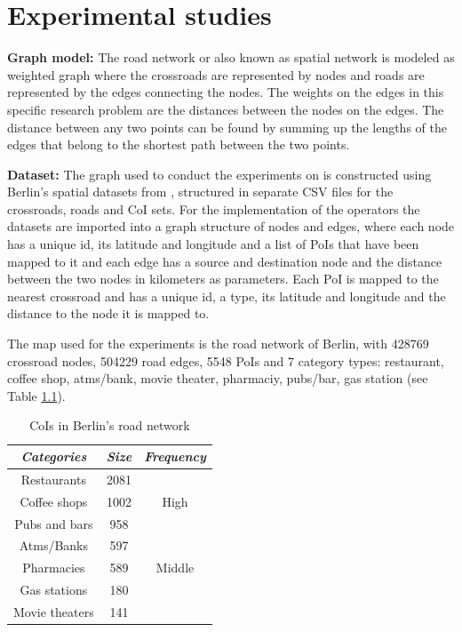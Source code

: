 \chapter{Experimental studies}
\label{sec:evaluation}

\textbf{Graph model:}
The road network or also known as spatial network is modeled as weighted graph where the crossroads are represented by nodes and roads are represented by the edges connecting the nodes. The weights on the edges in this specific research problem are the distances between the nodes on the edges. The distance between any two points can be found by summing up the lengths of the edges that belong to the shortest path between the two points.

\textbf{Dataset:}
The graph used to conduct the experiments on is constructed using Berlin's spatial datasets from \cite{datasets}, structured in separate CSV files for the crossroads, roads and CoI sets. For the implementation of the operators the datasets are imported into a graph structure of nodes and edges, where each node has a unique id, its latitude and longitude and a list of PoIs that have been mapped to it and each edge has a source and destination node and the distance between the two nodes in kilometers as parameters. Each PoI is mapped to the nearest crossroad and has a unique id, a type, its latitude and longitude and the distance to the node it is mapped to.

The map used for the experiments is the road network of Berlin, with 428769 crossroad nodes, 504229 road edges, 5548 PoIs and 7 category types: restaurant, coffee shop, atms/bank, movie theater, pharmaciy, pubs/bar, gas station (see Table \ref{dataset}). 

\begin{table}[H]
	\centering
	\begin{tabular}{ |c|c|c| } 
		\hline
		\textit{Categories} & \textit{Size} & \textit{Frequency}\\
		\hline
		Restaurants & 2081 & \multirow{3}{3em}{High}\\ 
		Coffee shops & 1002 &\\
		Pubs and bars & 958 &\\  
		\hline
		Atms/Banks & 597 & \multirow{3}{3em}{Middle}\\
		Pharmacies & 589 &\\
		\hline
		Gas stations & 180 & \multirow{3}{3em}{Low}\\
		Movie theaters & 141 &\\ 
		\hline
	\end{tabular}
	\caption{CoIs in Berlin's road network}
	\label{dataset}
\end{table}

